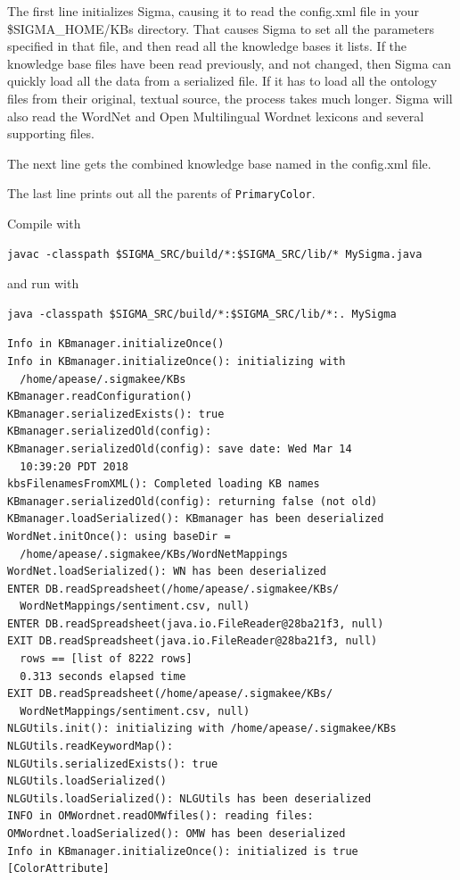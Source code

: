 \documentclass{book}
\begin{document}
The first line initializes Sigma, causing it to read the config.xml file in
your \$SIGMA\_HOME/KBs directory.  That causes Sigma to set all the parameters
specified in that file, and then read all the knowledge bases it lists.  If
the knowledge base files have been read previously, and not changed, then Sigma
can quickly load all the data from a serialized file.  If it has to load all the
ontology files from their original, textual source, the process takes much longer.
Sigma will also read the WordNet and Open Multilingual Wordnet lexicons and several
supporting files.

The next line gets the combined knowledge base named in the config.xml file.

The last line prints out all the parents of \texttt{PrimaryColor}.

Compile with

\begin{lstlisting}[basicstyle=\ttfamily\small\bfseries]
javac -classpath $SIGMA_SRC/build/*:$SIGMA_SRC/lib/* MySigma.java
\end{lstlisting}

and run with

\begin{lstlisting}[basicstyle=\ttfamily\small\bfseries]
java -classpath $SIGMA_SRC/build/*:$SIGMA_SRC/lib/*:. MySigma
\end{lstlisting}

\begin{lstlisting}[basicstyle=\ttfamily\small\bfseries]
Info in KBmanager.initializeOnce()
Info in KBmanager.initializeOnce(): initializing with
  /home/apease/.sigmakee/KBs
KBmanager.readConfiguration()
KBmanager.serializedExists(): true
KBmanager.serializedOld(config):
KBmanager.serializedOld(config): save date: Wed Mar 14
  10:39:20 PDT 2018
kbsFilenamesFromXML(): Completed loading KB names
KBmanager.serializedOld(config): returning false (not old)
KBmanager.loadSerialized(): KBmanager has been deserialized
WordNet.initOnce(): using baseDir =
  /home/apease/.sigmakee/KBs/WordNetMappings
WordNet.loadSerialized(): WN has been deserialized
ENTER DB.readSpreadsheet(/home/apease/.sigmakee/KBs/
  WordNetMappings/sentiment.csv, null)
ENTER DB.readSpreadsheet(java.io.FileReader@28ba21f3, null)
EXIT DB.readSpreadsheet(java.io.FileReader@28ba21f3, null)
  rows == [list of 8222 rows]
  0.313 seconds elapsed time
EXIT DB.readSpreadsheet(/home/apease/.sigmakee/KBs/
  WordNetMappings/sentiment.csv, null)
NLGUtils.init(): initializing with /home/apease/.sigmakee/KBs
NLGUtils.readKeywordMap():
NLGUtils.serializedExists(): true
NLGUtils.loadSerialized()
NLGUtils.loadSerialized(): NLGUtils has been deserialized
INFO in OMWordnet.readOMWfiles(): reading files:
OMWordnet.loadSerialized(): OMW has been deserialized
Info in KBmanager.initializeOnce(): initialized is true
[ColorAttribute]
\end{lstlisting}
\end{document}
